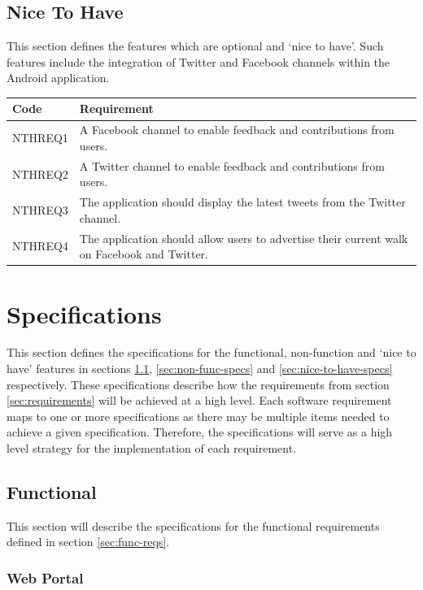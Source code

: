 \documentclass[11pt,a4paper]{article}
\begin{document}
\subsection{Nice To Have}
\label{sec:nice-to-have}

This section defines the features which are optional and `nice to have'.
Such features include the integration of Twitter and Facebook channels within the Android application.

\begin{longtable}{|p{2.5cm}p{13cm}|}
\hline
\textbf{Code} & \textbf{Requirement} \\

\hline
NTHREQ1 & A Facebook channel to enable feedback and contributions from users. \\ \hline
NTHREQ2 & A Twitter channel to enable feedback and contributions from users. \\ \hline
NTHREQ3 & The application should display the latest tweets from the Twitter channel. \\ \hline
NTHREQ4 & The application should allow users to advertise their current walk on Facebook and Twitter. \\ \hline
\end{longtable}

\section{Specifications}
\label{sec:specifications}

This section defines the specifications for the functional, non-function and `nice to have' features in sections \ref{sec:func-specs}, \ref{sec:non-func-specs} and \ref{sec:nice-to-have-specs} respectively.
These specifications describe how the requirements from section \ref{sec:requirements} will be achieved at a high level.
Each software requirement maps to one or more specifications as there may be multiple items needed to achieve a given specification.
Therefore, the specifications will serve as a high level strategy for the implementation of each requirement.

\subsection{Functional}
\label{sec:func-specs}

This section will describe the specifications for the functional requirements defined in section \ref{sec:func-reqs}.

\subsubsection{Web Portal}
\end{document}
